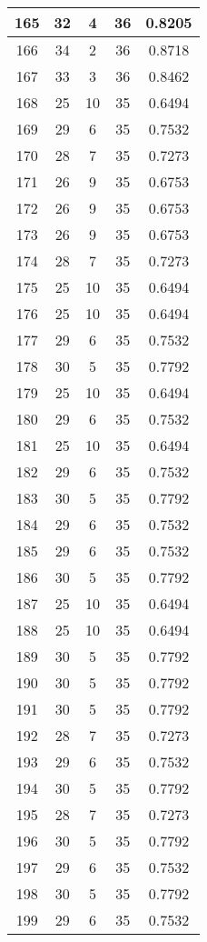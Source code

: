 \documentclass[letterpaper, 12pt]{article}
\begin{document}
\begin{longtable}{|c|c|c|c|c|}
\hline
165 & 32 & 4 & 36 & 0.8205 \\
\hline
166 & 34 & 2 & 36 & 0.8718 \\
\hline
167 & 33 & 3 & 36 & 0.8462 \\
\hline
168 & 25 & 10 & 35 & 0.6494 \\
\hline
169 & 29 & 6 & 35 & 0.7532 \\
\hline
170 & 28 & 7 & 35 & 0.7273 \\
\hline
171 & 26 & 9 & 35 & 0.6753 \\
\hline
172 & 26 & 9 & 35 & 0.6753 \\
\hline
173 & 26 & 9 & 35 & 0.6753 \\
\hline
174 & 28 & 7 & 35 & 0.7273 \\
\hline
175 & 25 & 10 & 35 & 0.6494 \\
\hline
176 & 25 & 10 & 35 & 0.6494 \\
\hline
177 & 29 & 6 & 35 & 0.7532 \\
\hline
178 & 30 & 5 & 35 & 0.7792 \\
\hline
179 & 25 & 10 & 35 & 0.6494 \\
\hline
180 & 29 & 6 & 35 & 0.7532 \\
\hline
181 & 25 & 10 & 35 & 0.6494 \\
\hline
182 & 29 & 6 & 35 & 0.7532 \\
\hline
183 & 30 & 5 & 35 & 0.7792 \\
\hline
184 & 29 & 6 & 35 & 0.7532 \\
\hline
185 & 29 & 6 & 35 & 0.7532 \\
\hline
186 & 30 & 5 & 35 & 0.7792 \\
\hline
187 & 25 & 10 & 35 & 0.6494 \\
\hline
188 & 25 & 10 & 35 & 0.6494 \\
\hline
189 & 30 & 5 & 35 & 0.7792 \\
\hline
190 & 30 & 5 & 35 & 0.7792 \\
\hline
191 & 30 & 5 & 35 & 0.7792 \\
\hline
192 & 28 & 7 & 35 & 0.7273 \\
\hline
193 & 29 & 6 & 35 & 0.7532 \\
\hline
194 & 30 & 5 & 35 & 0.7792 \\
\hline
195 & 28 & 7 & 35 & 0.7273 \\
\hline
196 & 30 & 5 & 35 & 0.7792 \\
\hline
197 & 29 & 6 & 35 & 0.7532 \\
\hline
198 & 30 & 5 & 35 & 0.7792 \\
\hline
199 & 29 & 6 & 35 & 0.7532 \\
\hline
\end{longtable}
\end{document}
